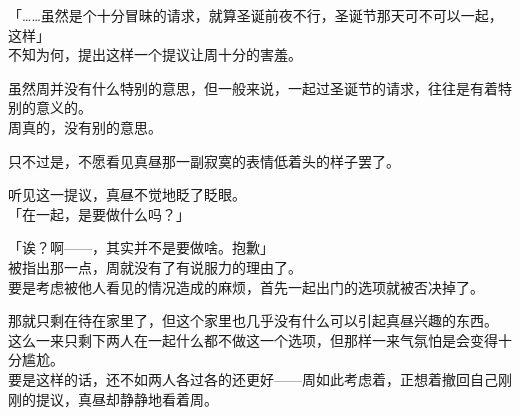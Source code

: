 「……虽然是个十分冒昧的请求，就算圣诞前夜不行，圣诞节那天可不可以一起，这样」\\

不知为何，提出这样一个提议让周十分的害羞。

虽然周并没有什么特别的意思，但一般来说，一起过圣诞节的请求，往往是有着特别的意义的。\\

周真的，没有别的意思。

只不过是，不愿看见真昼那一副寂寞的表情低着头的样子罢了。

听见这一提议，真昼不觉地眨了眨眼。\\

「在一起，是要做什么吗？」

「诶？啊——，其实并不是要做啥。抱歉」\\

被指出那一点，周就没有了有说服力的理由了。\\

要是考虑被他人看见的情况造成的麻烦，首先一起出门的选项就被否决掉了。

那就只剩在待在家里了，但这个家里也几乎没有什么可以引起真昼兴趣的东西。\\

这么一来只剩下两人在一起什么都不做这一个选项，但那样一来气氛怕是会变得十分尴尬。\\

要是这样的话，还不如两人各过各的还更好——周如此考虑着，正想着撤回自己刚刚的提议，真昼却静静地看着周。\\

